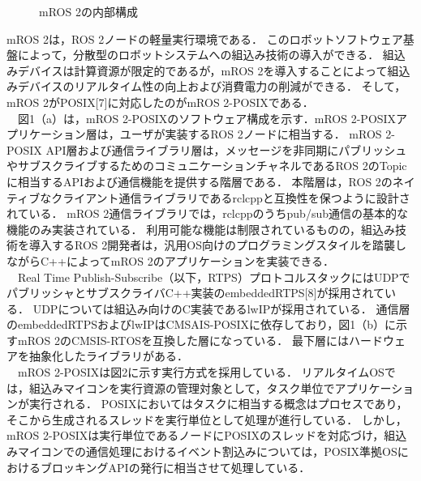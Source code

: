 \begin{figure}[ht]
\begin{minipage}{.48\textwidth}
        \caption{mROS 2の内部構成}
        \label{fig:subfig_b}
    \end{minipage}
\end{figure}

mROS 2は，ROS 2ノードの軽量実行環境である．
このロボットソフトウェア基盤によって，分散型のロボットシステムへの組込み技術の導入ができる．
組込みデバイスは計算資源が限定的であるが，mROS 2を導入することによって組込みデバイスのリアルタイム性の向上および消費電力の削減ができる．
そして，mROS 2がPOSIX[7]に対応したのがmROS 2-POSIXである．
\\　図1（a）は，mROS 2-POSIXのソフトウェア構成を示す．mROS 2-POSIXアプリケーション層は，ユーザが実装するROS 2ノードに相当する．
mROS 2-POSIX API層および通信ライブラリ層は，メッセージを非同期にパブリッシュやサブスクライブするためのコミュニケーションチャネルであるROS 2のTopicに相当するAPIおよび通信機能を提供する階層である．
本階層は，ROS 2のネイティブなクライアント通信ライブラリであるrclcppと互換性を保つように設計されている．
mROS 2通信ライブラリでは，rclcppのうちpub/sub通信の基本的な機能のみ実装されている．
利用可能な機能は制限されているものの，組込み技術を導入するROS 2開発者は，汎用OS向けのプログラミングスタイルを踏襲しながらC++によってmROS 2のアプリケーションを実装できる．
\\　Real Time Publish-Subscribe（以下，RTPS）プロトコルスタックにはUDPでパブリッシャとサブスクライバC++実装のembeddedRTPS[8]が採用されている．
UDPについては組込み向けのC実装であるlwIPが採用されている．
通信層のembeddedRTPSおよびlwIPはCMSAIS-POSIXに依存しており，図1（b）に示すmROS 2のCMSIS-RTOSを互換した層になっている．
最下層にはハードウェアを抽象化したライブラリがある．
\\　mROS 2-POSIXは図2に示す実行方式を採用している．
リアルタイムOSでは，組込みマイコンを実行資源の管理対象として，タスク単位でアプリケーションが実行される．
POSIXにおいてはタスクに相当する概念はプロセスであり，そこから生成されるスレッドを実行単位として処理が進行している．
しかし，mROS 2-POSIXは実行単位であるノードにPOSIXのスレッドを対応づけ，組込みマイコンでの通信処理におけるイベント割込みについては，POSIX準拠OSにおけるブロッキングAPIの発行に相当させて処理している．

